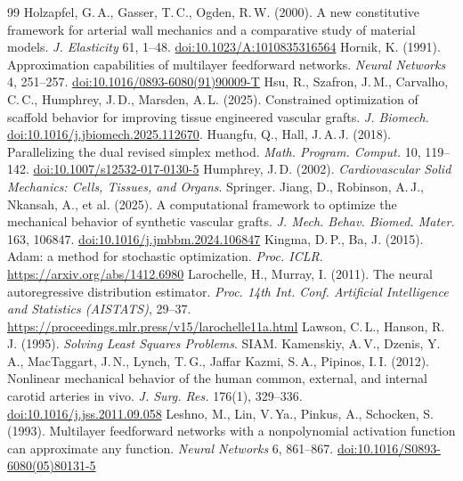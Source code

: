 \begin{thebibliography}{99}
 Holzapfel, G.\,A., Gasser, T.\,C., Ogden, R.\,W. (2000). A new constitutive framework for arterial wall mechanics and a comparative study of material models. \emph{J. Elasticity} 61, 1--48. \href{https://doi.org/10.1023/A:1010835316564}{doi:10.1023/A:1010835316564}
 Hornik, K. (1991). Approximation capabilities of multilayer feedforward networks. \emph{Neural Networks} 4, 251--257. \href{https://doi.org/10.1016/0893-6080(91)90009-T}{doi:10.1016/0893-6080(91)90009-T}
 Hsu, R., Szafron, J.\,M., Carvalho, C.\,C., Humphrey, J.\,D., Marsden, A.\,L. (2025). Constrained optimization of scaffold behavior for improving tissue engineered vascular grafts. \emph{J. Biomech.} \href{https://doi.org/10.1016/j.jbiomech.2025.112670}{doi:10.1016/j.jbiomech.2025.112670}.
 Huangfu, Q., Hall, J.\,A.\,J. (2018). Parallelizing the dual revised simplex method. \emph{Math. Program. Comput.} 10, 119--142. \href{https://doi.org/10.1007/s12532-017-0130-5}{doi:10.1007/s12532-017-0130-5}
 Humphrey, J.\,D. (2002). \emph{Cardiovascular Solid Mechanics: Cells, Tissues, and Organs}. Springer.
 Jiang, D., Robinson, A.\,J., Nkansah, A., et al. (2025). A computational framework to optimize the mechanical behavior of synthetic vascular grafts. \emph{J. Mech. Behav. Biomed. Mater.} 163, 106847. \href{https://doi.org/10.1016/j.jmbbm.2024.106847}{doi:10.1016/j.jmbbm.2024.106847}
 Kingma, D.\,P., Ba, J. (2015). Adam: a method for stochastic optimization. \emph{Proc. ICLR}. \url{https://arxiv.org/abs/1412.6980}
 Larochelle, H., Murray, I. (2011). The neural autoregressive distribution estimator. \emph{Proc. 14th Int. Conf. Artificial Intelligence and Statistics (AISTATS)}, 29--37. \url{https://proceedings.mlr.press/v15/larochelle11a.html}
 Lawson, C.\,L., Hanson, R.\,J. (1995). \emph{Solving Least Squares Problems}. SIAM.
 Kamenskiy, A.\,V., Dzenis, Y.\,A., MacTaggart, J.\,N., Lynch, T.\,G., Jaffar Kazmi, S.\,A., Pipinos, I.\,I. (2012). Nonlinear mechanical behavior of the human common, external, and internal carotid arteries in vivo. \emph{J. Surg. Res.} 176(1), 329--336. \href{https://doi.org/10.1016/j.jss.2011.09.058}{doi:10.1016/j.jss.2011.09.058}
 Leshno, M., Lin, V.\,Ya., Pinkus, A., Schocken, S. (1993). Multilayer feedforward networks with a nonpolynomial activation function can approximate any function. \emph{Neural Networks} 6, 861--867. \href{https://doi.org/10.1016/S0893-6080(05)80131-5}{doi:10.1016/S0893-6080(05)80131-5}

\end{thebibliography}
